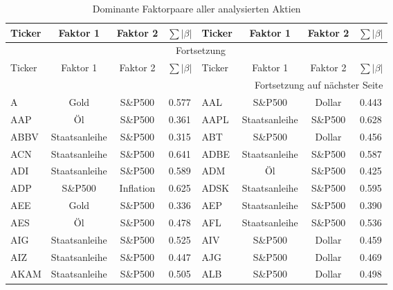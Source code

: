 \footnotesize
\begin{longtable}{l c c c | l c c c}
    \caption{Dominante Faktorpaare aller analysierten Aktien}\label{tab:all_factor_pairs}                   \\
    \toprule
    Ticker & Faktor 1      & Faktor 2  & $\sum|\beta|$ & Ticker & Faktor 1      & Faktor 2  & $\sum|\beta|$ \\
    \midrule
    \endfirsthead
    \multicolumn{8}{c}{\tablename\ \thetable{} Fortsetzung}                                                 \\
    \toprule
    Ticker & Faktor 1      & Faktor 2  & $\sum|\beta|$ & Ticker & Faktor 1      & Faktor 2  & $\sum|\beta|$ \\
    \midrule
    \endhead
    \midrule
    \multicolumn{8}{r}{Fortsetzung auf nächster Seite}                                                      \\
    \endfoot
    \bottomrule
    \endlastfoot
    A      & Gold          & S\&P500   & 0.577         & AAL    & S\&P500       & Dollar    & 0.443         \\
    AAP    & Öl            & S\&P500   & 0.361         & AAPL   & Staatsanleihe & S\&P500   & 0.628         \\
    ABBV   & Staatsanleihe & S\&P500   & 0.315         & ABT    & S\&P500       & Dollar    & 0.456         \\
    ACN    & Staatsanleihe & S\&P500   & 0.641         & ADBE   & Staatsanleihe & S\&P500   & 0.587         \\
    ADI    & Staatsanleihe & S\&P500   & 0.589         & ADM    & Öl            & S\&P500   & 0.425         \\
    ADP    & S\&P500       & Inflation & 0.625         & ADSK   & Staatsanleihe & S\&P500   & 0.595         \\
    AEE    & Gold          & S\&P500   & 0.336         & AEP    & Staatsanleihe & S\&P500   & 0.390         \\
    AES    & Öl            & S\&P500   & 0.478         & AFL    & Staatsanleihe & S\&P500   & 0.536         \\
    AIG    & Staatsanleihe & S\&P500   & 0.525         & AIV    & S\&P500       & Dollar    & 0.459         \\
    AIZ    & Staatsanleihe & S\&P500   & 0.447         & AJG    & S\&P500       & Dollar    & 0.469         \\
    AKAM   & Staatsanleihe & S\&P500   & 0.505         & ALB    & S\&P500       & Dollar    & 0.498         \\

\end{longtable}
